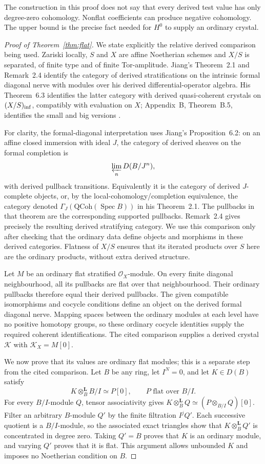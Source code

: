 \documentclass[11pt]{article}
\newcommand{\OO}{\mathcal O}\newcommand{\Fp}{\mathbf F_p}
\DeclareMathOperator{\Spec}{Spec}\DeclareMathOperator{\Hom}{Hom}
\theoremstyle{definition}\newtheorem{definition}[theorem]{Definition}
\theoremstyle{remark}\newtheorem{remark}[theorem]{Remark}
\begin{document}
The construction in this proof does not say that every derived test value has only degree-zero cohomology. Nonflat coefficients can produce negative cohomology. The upper bound is the precise fact needed for $H^0$ to supply an ordinary crystal.

\begin{proof}[Proof of Theorem~\ref{thm:flat}]
We state explicitly the relative derived comparison being used.  Zariski locally, $S$ and $X$ are affine Noetherian schemes and $X/S$ is separated, of finite type and of finite Tor-amplitude.  Jiang's Theorem~2.1 and Remark~2.4 identify the category of derived stratifications on the intrinsic formal diagonal nerve with modules over his derived differential-operator algebra.  His Theorem~6.3 identifies the latter category with derived quasi-coherent crystals on $(X/S)_{\rm inf}$, compatibly with evaluation on $X$; Appendix~B, Theorem~B.5, identifies the small and big versions \citep[pp.~16--17, 32--34 and 43--45]{Jiang}.

For clarity, the formal-diagonal interpretation uses Jiang's Proposition~6.2: on an affine closed immersion with ideal $J$, the category of derived sheaves on the formal completion is
\[
       \varprojlim_n D(B/J^n),
\]
with derived pullback transitions.  Equivalently it is the category of derived $J$-complete objects, or, by the local-cohomology/completion equivalence, the category denoted $\Gamma_J(\mathrm{QCoh}(\Spec B))$ in his Theorem~2.1.  The pullbacks in that theorem are the corresponding supported pullbacks.  Remark~2.4 gives precisely the resulting derived stratifying category.  We use this comparison only after checking that the ordinary data define objects and morphisms in these derived categories.  Flatness of $X/S$ ensures that its iterated products over $S$ here are the ordinary products, without extra derived structure.

Let $M$ be an ordinary flat stratified $\OO_X$-module.  On every finite diagonal neighbourhood, all its pullbacks are flat over that neighbourhood.  Their ordinary pullbacks therefore equal their derived pullbacks.  The given compatible isomorphisms and cocycle conditions define an object on the derived formal diagonal nerve.  Mapping spaces between the ordinary modules at each level have no positive homotopy groups, so these ordinary cocycle identities supply the required coherent identifications.  The cited comparison supplies a derived crystal $\mathcal K$ with $\mathcal K_X=M[0]$.

We now prove that its values are ordinary flat modules; this is a separate step from the cited comparison.  Let $B$ be any ring, let $I^N=0$, and let $K\in D(B)$ satisfy
\[
          K\otimes_B^{\mathbf L}B/I\simeq P[0],
          \qquad P\text{ flat over }B/I.
\]
For every $B/I$-module $Q$, tensor associativity gives
$K\otimes_B^{\mathbf L}Q\simeq(P\otimes_{B/I}Q)[0]$.
Filter an arbitrary $B$-module $Q'$ by the finite filtration $I^jQ'$.  Each successive quotient is a $B/I$-module, so the associated exact triangles show that $K\otimes_B^{\mathbf L}Q'$ is concentrated in degree zero.  Taking $Q'=B$ proves that $K$ is an ordinary module, and varying $Q'$ proves that it is flat.  This argument allows unbounded $K$ and imposes no Noetherian condition on $B$.


\end{proof}
\end{document}
